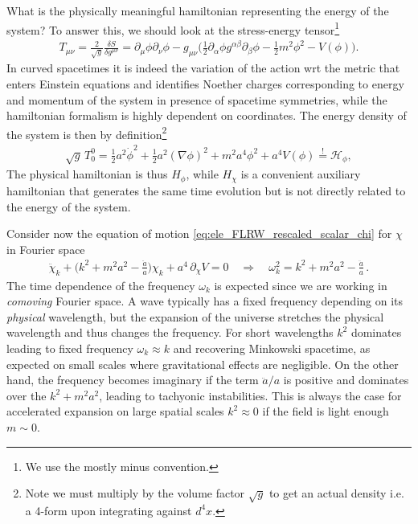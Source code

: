 \documentclass[../QFT_main.tex]{subfiles}
\begin{document}
What is the physically meaningful hamiltonian representing the energy of the system?
To answer this, we should look at the stress-energy tensor\footnote{We use the mostly minus convention.}
\begin{align}
  T_{\mu\nu}= \frac{2}{\sqrt{g}} \frac{\delta S}{\delta g^{\mu\nu}} = \partial_\mu \phi \partial_\nu \phi - g_{\mu\nu} \Big( \tfrac12 \partial_\alpha \phi g^{\alpha\beta} \partial_\beta \phi - \tfrac12 m^2 \phi^2 - V(\phi) \Big).
\end{align}
In curved spacetimes it is indeed the variation of the action wrt the metric that enters Einstein equations and identifies Noether charges corresponding to energy and momentum of the system in presence of spacetime symmetries, while the hamiltonian formalism is highly dependent on coordinates.
The energy density of the system is then by definition\footnote{Note we must multiply by the volume factor $\sqrt{g}$ to get an actual density i.e. a 4-form upon integrating against $d^4x$.}
\begin{align}
  \sqrt{g}\,T^0_0 = \tfrac12 a^2\dot{\phi}^2 + \tfrac12 a^2(\nabla \phi)^2 + m^2 a^4 \phi^2 + a^4 V(\phi) \overset{!}{=} \mathcal{H}_\phi,
\end{align}
The physical hamiltonian is thus $H_\phi$, while $H_\chi$ is a convenient auxiliary hamiltonian that generates the same time evolution but is not directly related to the energy of the system.

Consider now the equation of motion \eqref{eq:ele_FLRW_rescaled_scalar_chi} for $\chi$ in Fourier space
\begin{align}
    \ddot{\chi}_k + \big(k^2 + m^2 a^2 - \tfrac{\ddot{a}}{a}\big) \chi_k + a^4 \,\partial_{\chi}\! V = 0
    \quad\Rightarrow\quad \omega_k^2=k^2 + m^2 a^2 - \tfrac{\ddot{a}}{a}\,.
\end{align}
The time dependence of the frequency $\omega_k$ is expected since we are working in \emph{comoving} Fourier space.
A wave typically has a fixed frequency depending on its \emph{physical} wavelength, but the expansion of the universe stretches the physical wavelength and thus changes the frequency.
For short wavelengths $k^2$ dominates leading to fixed frequency $\omega_k \approx k$ and recovering Minkowski spacetime, as expected on small scales where gravitational effects are negligible.
On the other hand, the frequency becomes imaginary if the term $\ddot{a}/a$ is positive and dominates over the $k^2 + m^2 a^2$, leading to tachyonic instabilities.
This is always the case for accelerated expansion on large spatial scales $k^2\approx0$ if the field is light enough $m\sim 0$.
\end{document}
